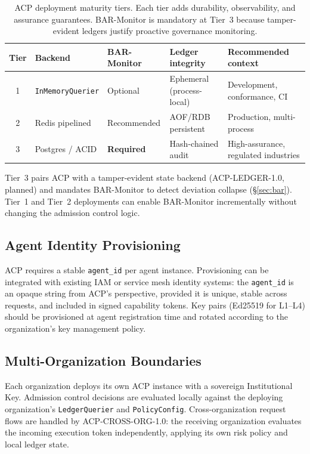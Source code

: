 \documentclass[11pt]{article}
\theoremstyle{definition}
\begin{document}
\begin{table}[h!]
\centering\small
\caption{ACP deployment maturity tiers.
Each tier adds durability, observability, and assurance guarantees.
BAR-Monitor is mandatory at Tier~3 because tamper-evident ledgers justify
proactive governance monitoring.}
\label{tab:maturity}
\begin{tabular}{@{}cllll@{}}
\toprule
Tier & Backend & BAR-Monitor & Ledger integrity & Recommended context \\
\midrule
1 & \texttt{InMemoryQuerier} & Optional & Ephemeral (process-local) & Development, conformance, CI \\
2 & Redis pipelined         & Recommended & AOF/RDB persistent & Production, multi-process \\
3 & Postgres / ACID         & \textbf{Required} & Hash-chained audit & High-assurance, regulated industries \\
\bottomrule
\end{tabular}
\end{table}

\noindent Tier~3 pairs ACP with a tamper-evident state backend (ACP-LEDGER-1.0, planned)
and mandates BAR-Monitor to detect deviation collapse (\S\ref{sec:bar}).
Tier~1 and Tier~2 deployments can enable BAR-Monitor incrementally
without changing the admission control logic.

\subsection{Agent Identity Provisioning}

ACP requires a stable \texttt{agent\_id} per agent instance.
Provisioning can be integrated with existing IAM or service mesh identity systems:
the \texttt{agent\_id} is an opaque string from ACP's perspective,
provided it is unique, stable across requests, and included in signed capability tokens.
Key pairs (Ed25519 for L1--L4) should be provisioned at agent registration time
and rotated according to the organization's key management policy.

\subsection{Multi-Organization Boundaries}

Each organization deploys its own ACP instance with a sovereign Institutional Key.
Admission control decisions are evaluated locally against the deploying organization's
\texttt{LedgerQuerier} and \texttt{PolicyConfig}.
Cross-organization request flows are handled by ACP-CROSS-ORG-1.0:
the receiving organization evaluates the incoming execution token independently,
applying its own risk policy and local ledger state.
\end{document}
